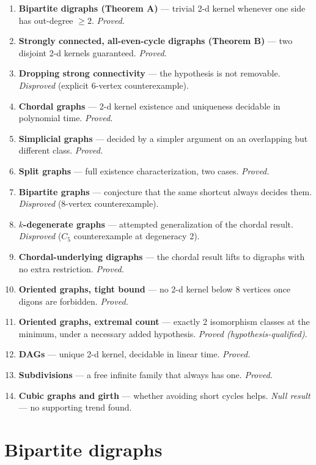 \documentclass[11pt]{article}
\theoremstyle{plain}
\theoremstyle{definition}
\theoremstyle{remark}
\begin{document}
\begin{enumerate}[leftmargin=2.2em]
\item \textbf{Bipartite digraphs (Theorem A)} — trivial 2-d kernel whenever one side
has out-degree $\ge 2$. \textit{Proved.}
\item \textbf{Strongly connected, all-even-cycle digraphs (Theorem B)} — two disjoint
2-d kernels guaranteed. \textit{Proved.}
\item \textbf{Dropping strong connectivity} — the hypothesis is not removable.
\textit{Disproved} (explicit 6-vertex counterexample).
\item \textbf{Chordal graphs} — 2-d kernel existence and uniqueness decidable in
polynomial time. \textit{Proved.}
\item \textbf{Simplicial graphs} — decided by a simpler argument on an overlapping
but different class. \textit{Proved.}
\item \textbf{Split graphs} — full existence characterization, two cases.
\textit{Proved.}
\item \textbf{Bipartite graphs} — conjecture that the same shortcut always decides
them. \textit{Disproved} (8-vertex counterexample).
\item \textbf{$k$-degenerate graphs} — attempted generalization of the chordal
result. \textit{Disproved} ($C_5$ counterexample at degeneracy 2).
\item \textbf{Chordal-underlying digraphs} — the chordal result lifts to digraphs
with no extra restriction. \textit{Proved.}
\item \textbf{Oriented graphs, tight bound} — no 2-d kernel below 8 vertices once
digons are forbidden. \textit{Proved.}
\item \textbf{Oriented graphs, extremal count} — exactly 2 isomorphism classes at
the minimum, under a necessary added hypothesis. \textit{Proved (hypothesis-qualified)}.
\item \textbf{DAGs} — unique 2-d kernel, decidable in linear time. \textit{Proved.}
\item \textbf{Subdivisions} — a free infinite family that always has one.
\textit{Proved.}
\item \textbf{Cubic graphs and girth} — whether avoiding short cycles helps.
\textit{Null result} — no supporting trend found.
\end{enumerate}

\section{Bipartite digraphs}
\end{document}

